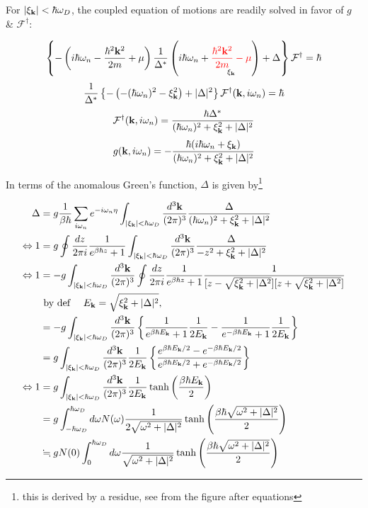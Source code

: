 For $|\xi_{\bf k}|<\hbar\omega_D$, the coupled equation of motions are readily solved in favor of $g$ \& $\mathcal{F}^\dagger$:

\[\left\{-\left(i\hbar\omega_n-\frac{\hbar^2{\bf k}^2}{2m}+\mu\right)\frac{1}{\Delta^*}\left(i\hbar\omega_n+\underset{\xi_{\bf k}}{{\color{red}{\frac{\hbar^2{\bf k}^2}{2m}-\mu}}}\right)+\Delta\right\}\mathcal{F}^\dagger = \hbar\]
\[\frac{1}{\Delta^*}\left\{-\left(-(\hbar\omega_n)^2-\xi_{\bf k}^2\right)+|\Delta|^2\right\}\mathcal{F}^\dagger({\bf k},i\omega_n) = \hbar\]
\[\mathcal{F}^\dagger({\bf k},i\omega_n) = \frac{\hbar\Delta^*}{(\hbar\omega_n)^2+\xi_{\bf k}^2+|\Delta|^2} \]
\[g({\bf k},i\omega_n) = -\frac{\hbar(i\hbar\omega_n+\xi_{\bf k})}{(\hbar\omega_n)^2+\xi_{\bf k}^2+|\Delta|^2} \]

In terms of the anomalous Green's function, $\Delta$ is given by\footnote{this is derived by a residue, see from the figure after equations}



\[\begin{split}
\Delta &= g\frac{1}{\beta\hbar}\sum_{i\omega_n}e^{-i\omega_n\eta}\int_{|\xi_{\bf k}|<\hbar\omega_D}\frac{d^3\bf k}{(2\pi)^3}\frac{\Delta}{(\hbar\omega_n)^2+\xi_{\bf k}^2+|\Delta|^2}\\
\Leftrightarrow 1&=g\oint \frac{dz}{2\pi i}\frac{1}{e^{\beta\hbar z}+1}\int_{|\xi_{\bf k}|<\hbar\omega_D}\frac{d^3\bf k}{(2\pi)^3}\frac{\Delta}{-z^2+\xi_{\bf k}^2+|\Delta|^2}\\
\Leftrightarrow 1&=-g\int_{|\xi_{\bf k}|<\hbar\omega_D}\frac{d^3\bf k}{(2\pi)^3}\oint \frac{dz}{2\pi i}\frac{1}{e^{\beta\hbar z}+1}\frac{1}{[z-\sqrt{\xi_{\bf k}^2+|\Delta^2}][z+\sqrt{\xi_{\bf k}^2+|\Delta^2}]}\\
&\text{ by def }\quad E_{\bf k} = \sqrt{\xi_{\bf k}^2+|\Delta|^2} ,\\
&=-g\int_{|\xi_{\bf k}|<\hbar\omega_D}\frac{d^3\bf k}{(2\pi)^3}\left\{\frac{1}{e^{\beta\hbar E_{\bf k}}+1}\frac{1}{2E_{\bf k}} - \frac{1}{e^{-\beta\hbar E_{\bf k}}+1}\frac{1}{2E_{\bf k}}\right\}\\
&=g\int_{|\xi_{\bf k}|<\hbar\omega_D}\frac{d^3\bf k}{(2\pi)^3}\frac{1}{2E_{\bf k}}\left\{\frac{e^{\beta\hbar E_{\bf k}/2} - e^{-\beta\hbar E_{\bf k}/2}}{e^{\beta\hbar E_{\bf k}/2} + e^{-\beta\hbar E_{\bf k}/2}}\right\}\\
\Leftrightarrow 1&=g\int_{|\xi_{\bf k}|<\hbar\omega_D}\frac{d^3\bf k}{(2\pi)^3}\frac{1}{2E_{\bf k}}\tanh\left(\frac{\beta\hbar E_{\bf k}}{2}\right)\\
&=g\int_{-\hbar\omega_D}^{\hbar\omega_D} d\omega N(\omega)\frac{1}{2\sqrt{\omega^2+|\Delta|^2}}\tanh\left(\frac{\beta\hbar\sqrt{\omega^2+|\Delta|^2}}{2}\right)\\
&\fallingdotseq gN(0)\int_0^{\hbar\omega_D}d\omega\frac{1}{\sqrt{\omega^2+|\Delta|^2}}\tanh\left(\frac{\beta\hbar\sqrt{\omega^2+|\Delta|^2}}{2}\right)
\end{split} \]

